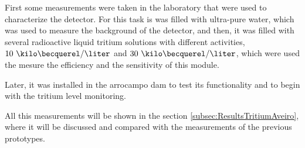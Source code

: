 First some measurements were taken in the laboratory that were used to characterize the detector. For this task is was filled with ultra-pure water, which was used to measure the background of the detector, and then, it was filled with several radioactive liquid tritium solutions with different activities, $10~\kilo\becquerel/\liter$ and $30~\kilo\becquerel/\liter$, which were used the mesure the efficiency and the sensitivity of this module.

Later, it was installed in the arrocampo dam to test its functionality and to begin with the tritium level monitoring.

All this measurements will be shown in the section \ref{subsec:ResultsTritiumAveiro}, where it will be discussed and compared with the measurements of the previous prototypes.


